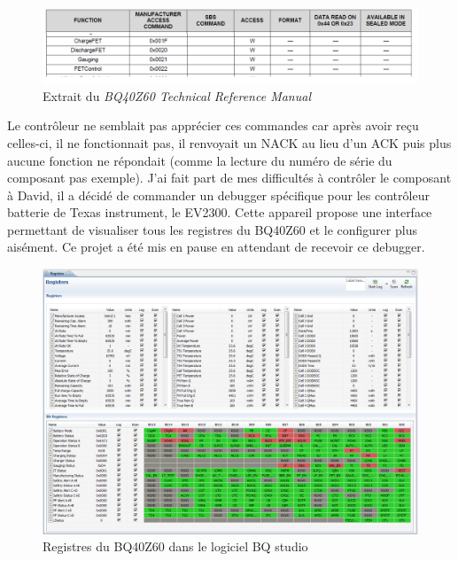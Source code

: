\documentclass[a4paper, 11pt]{report}
\begin{document}
\begin{figure}[!h]
\begin{center}
\includegraphics[width=\textwidth]{figures/screenshots/BQ40Z60_manual_excerpt.png}
\end{center}
\caption{Extrait du \emph{BQ40Z60 Technical Reference Manual}} %
\label{fig:BQ40Z60_manual_excerpt}
\end{figure}

Le contrôleur ne semblait pas apprécier ces commandes car après avoir reçu celles-ci, il ne fonctionnait pas, il renvoyait un NACK au lieu d’un ACK puis plus aucune fonction ne répondait (comme la lecture du numéro de série du composant pas exemple).
J’ai fait part de mes difficultés à contrôler le composant à David, il a décidé de commander un debugger spécifique pour les contrôleur batterie de Texas instrument, le EV2300. Cette appareil propose une interface permettant de visualiser tous les registres du BQ40Z60 et le configurer plus aisément. Ce projet a été mis en pause en attendant de recevoir ce debugger.

\begin{figure}[!h]
\begin{center}
\includegraphics[scale=0.4]{figures/screenshots/BQ40Z60_registers.png}
\end{center}
\caption{Registres du BQ40Z60 dans le logiciel BQ studio} %
\label{fig:BQ40Z60_registers}
\end{figure}
\end{document}
